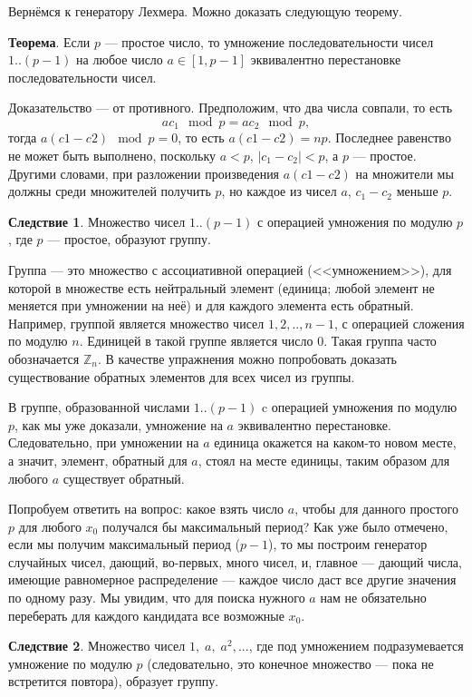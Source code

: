 \documentclass{book}
\begin{document}
Вернёмся к генератору Лехмера. Можно доказать следующую теорему.

{\bf Теорема}. Если $p$ --- простое число, то умножение последовательности чисел $1..(p - 1)$ на
любое число $a \in [1, p - 1]$ эквивалентно перестановке последовательности чисел.

Доказательство --- от противного. Предположим, что два числа совпали, то есть
\begin{equation}
    a c_1 \mod p = a c_2 \mod p,
\end{equation}
тогда $a (c1 - c2) \mod p = 0 $, то есть $a (c1 - c2) = n p$.  Последнее равенство не может быть
выполнено, поскольку $a < p$, $|c_1 - c_2| < p$, а $p$ --- простое. Другими словами, при разложении
произведения $a (c1 - c2)$ на множители мы должны среди множителей получить $p$, но каждое из чисел
$a$, $c_1 - c_2$ меньше $p$.

{\bf Следствие 1}. Множество чисел $1..(p - 1)$ с операцией умножения по модулю $p$, где $p$ --- простое,
образуют группу.

Группа --- это множество с ассоциативной операцией (<<умножением>>), для которой в множестве есть
нейтральный элемент (единица; любой элемент не меняется при умножении на неё) и для каждого
элемента есть обратный. Например, группой является множество чисел $1, 2,.., n - 1$, с операцией
сложения по модулю $n$. Единицей в такой группе является число $0$. Такая группа часто обозначается
$\mathbb Z_n$. В качестве упражнения можно попробовать доказать существование обратных элементов
для всех чисел из группы.

В группе, образованной числами $1..(p-1)$ c операцией умножения по модулю $p$, как мы уже доказали,
умножение на $a$ эквивалентно перестановке. Следовательно, при умножении на $a$ единица окажется на
каком-то новом месте, а значит, элемент, обратный для $a$, стоял на месте единицы, таким образом
для любого $a$ существует обратный.

Попробуем ответить на вопрос: какое взять число $a$, чтобы для данного простого $p$ для любого
$x_0$ получался бы максимальный период? Как уже было отмечено, если мы получим максимальный период
($p-1$), то мы построим генератор случайных чисел, дающий, во-первых, много чисел, и, главное ---
дающий числа, имеющие равномерное распределение --- каждое число даст все другие значения по одному
разу. Мы увидим, что для поиска нужного $a$ нам не обязательно переберать для каждого кандидата все
возможные $x_0$.

{\bf Следствие 2}. Множество чисел $1,\; a,\; a^2, ...$, где под умножением подразумевается
умножение по модулю $p$ (следовательно, это конечное множество --- пока не встретится повтора),
образует группу.
\end{document}
